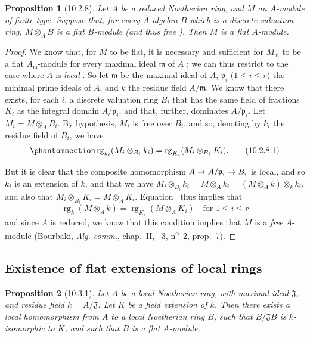 \documentclass[oneside]{amsart}
\theoremstyle{ega-env-style}
\theoremstyle{ega-thm-env-style}
\newtheorem*{proposition}{Proposition}
\theoremstyle{ega-defn-env-style}
\def\leq{\leqslant}                 %
\def\rg{\operatorname{rg}}
\renewcommand{\to}{\mathchoice{\longrightarrow}{\rightarrow}{\rightarrow}{\rightarrow}}
\let\EGAOriginalLabel\label
\renewcommand{\label}[1]{\phantomsection\EGAOriginalLabel{#1}}
\begin{document}
\begin{proposition}[10.2.8]
\label{0.10.2.8}
Let $A$ be a reduced Noetherian ring, and $M$ an $A$-module of finite type.
Suppose that, for every $A$-algebra $B$ which is a discrete valuation ring, $M\otimes_A B$ is a flat $B$-module (and thus free ).
Then $M$ is a flat $A$-module.
\end{proposition}

\begin{proof}
We know that, for $M$ to be flat, it is necessary and sufficient for $M_\mathfrak{m}$ to be a flat $A_\mathfrak{m}$-module for every maximal ideal $\mathfrak{m}$ of $A$ ;
we can thus restrict to the case where $A$ is \emph{local} .
So let $\mathfrak{m}$ be the maximal ideal of $A$, $\mathfrak{p}_i$ ($1\leq i\leq r$) the minimal prime ideals of $A$, and $k$ the residue field $A/\mathfrak{m}$.
We know  that there exists, for each $i$, a discrete valuation ring $B_i$ that has the same field of fractions $K_i$ as the integral domain $A/\mathfrak{p}_i$, and that, further, dominates $A/\mathfrak{p}_i$.
Let $M_i=M\otimes_A B_i$.
By hypothesis, $M_i$ is free over $B_i$, and so, denoting by $k_i$ the residue field of $B_i$, we have
\[
\label{0.10.2.8.1}
  \rg_{k_i}(M_i\otimes_{B_i}k_i)=\rg_{K_i}(M_i\otimes_{B_i}K_i).
  \tag{10.2.8.1}
\]

But it is clear that the composite homomorphism $A\to A/\mathfrak{p}_i\to B_i$ is local, and so $k_i$ is an extension of $k$, and that we have $M_i\otimes_{B_i}k_i = M\otimes_A k_i = (M\otimes_A k)\otimes_k k_i$, and also that $M_i\otimes_{B_i}K_i = M\otimes_A K_i$.
Equation~ thus implies that
\[
  \rg_k(M\otimes_A k)=\rg_{K_i}(M\otimes_A K_i)\quad\mbox{for $1\leq i\leq r$}
\]
and since $A$ is reduced, we know that this condition implies that $M$ is a \emph{free} $A$-module (Bourbaki, \emph{Alg. comm.}, chap.~II, \textsection~3, n\textsuperscript{o}~2, prop.~7).
\end{proof}

\subsection{Existence of flat extensions of local rings}
\label{subsection:0.10.3}

\begin{proposition}[10.3.1]
\label{0.10.3.1}
Let $A$ be a local Noetherian ring, with maximal ideal $\mathfrak{J}$, and residue field $k=A/\mathfrak{J}$.
Let $K$ be a field extension of $k$.
Then there exists a local homomorphism from $A$ to a local Noetherian ring $B$, such that $B/\mathfrak{J}B$ is $k$-isomorphic to $K$, and such that $B$ is a flat $A$-module.
\end{proposition}
\end{document}

